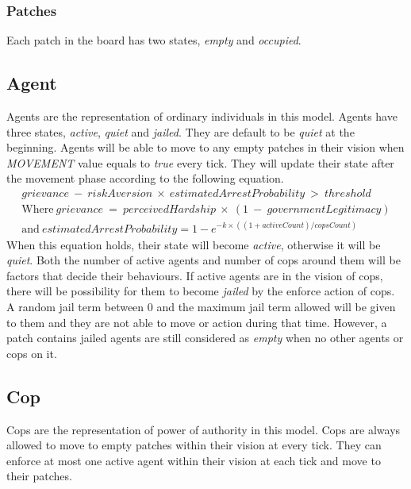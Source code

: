 \documentclass[11pt]{article}
\begin{document}
        \subsubsection{Patches}
        Each patch in the board has two states, \textit{empty} and \textit{occupied}.
        \subsection{Agent}
        Agents are the representation of ordinary individuals in this model. Agents
        have three states, \textit{active}, \textit{quiet} and \textit{jailed}. 
        They are default to be \textit{quiet} at the beginning. Agents will be able
        to move to any empty patches in their vision when \textit{MOVEMENT} value
        equals to \textit{true} every tick. They will update their state after the
        movement phase according to the following equation.
        \begin{equation}
            \begin{split}
                grievance\:-\:riskAversion\:\times\:estimatedArrestProbability\:>\:threshold \\
                \text{Where}\ grievance\:=\:perceivedHardship\:\times\:(1\:-\:governmentLegitimacy)\\
                \text{and}\ estimatedArrestProbability = 1 - e^{-k \times ((1 + activeCount) / copsCount)}
            \end{split}
        \end{equation}  
        When this equation holds, their state will become \textit{active}, otherwise
        it will be \textit{quiet}. Both the number of active agents and number of
        cops around them will be factors that decide their behaviours.
        If active agents are in the vision of cops, there
        will be possibility for them to become \textit{jailed} by the enforce action
        of cops. A random jail term between 0 and the maximum jail term allowed will
        be given to them and they are not able to move or action during that time.
        However, a patch contains jailed agents are still considered as \textit{empty}
        when no other agents or cops on it.
        \subsection{Cop}
        Cops are the representation of power of authority in this model. Cops
        are always allowed to move to empty patches within their vision at 
        every tick. They can enforce at most one active agent within their vision
        at each tick and move to their patches.
\end{document}
